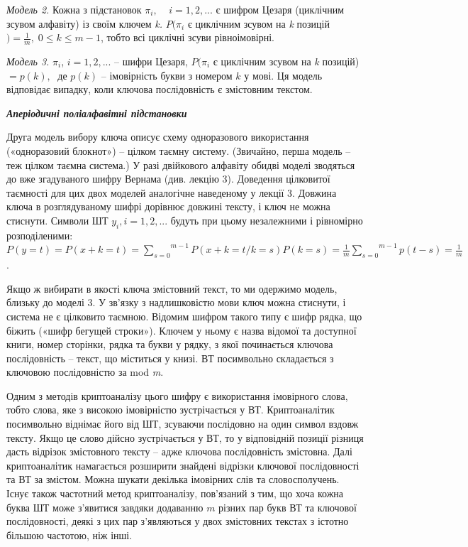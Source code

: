 \documentclass[a4paper]{article}
\newcounter{}
\begin{document}
 \textit{Модель 2.  } Кожна з підстановок  ${\pi
_{{i}},\;\;\;\;i=1,2,\text{.}\text{.}\text{.}}$ є шифром Цезаря (циклічним
зсувом алфавіту) із своїм ключем \textit{k}\textit{.}   ${P(\pi _{{i}}}$ є
циклічним зсувом на \textit{k} позицій ${)=\frac{1}{m},\;0\le k\le m-1}$, тобто
всі циклічні зсуви  рівноімовірні. $ $

 \textit{Модель 3.  } ${\pi _{{i}}}$,  ${i=1,2,\text{.}\text{.}\text{.}}$ –
шифри Цезаря,  ${P(\pi _{{i}}}$ є циклічним зсувом на \textit{k} позицій) 
${=p(k),\;}$ де  ${p(k)}$ – імовірність букви з номером  ${k}$ у мові. Ця
модель відповідає випадку, коли ключова послідовність є змістовним текстом. 


\bigskip

{\centering\bfseries\itshape
Аперіодичні поліалфавітні підстановки
\par}


\bigskip

Друга модель вибору ключа описує схему одноразового використання («одноразовий
блокнот») – цілком таємну систему. (Звичайно, перша модель – теж цілком таємна
система.) У разі двійкового алфавіту обидві моделі зводяться до вже згадуваного
шифру Вернама (див. лекцію 3). Доведення цілковитої таємності для цих двох
моделей аналогічне наведеному у лекції 3. Довжина ключа в розглядуваному шифрі
дорівнює довжині тексту, і ключ не можна стиснути. Символи ШТ 
${y_{{i}},i=1,2,\text{.}\text{.}\text{.}}$ будуть при цьому незалежними і
рівномірно розподіленими: 
${P(y=t)=P(x+k=t)=\overset{{m-1}}{\underset{{s=0}}{\sum
}}{P(x+k=t/k=s)P(k=s)}=\frac{1}{m}\overset{{m-1}}{\underset{{s=0}}{\sum
}}{p(t-s)=\frac{1}{m}}}$.

Якщо ж вибирати в якості ключа змістовний текст, то ми одержимо модель, близьку
до моделі 3. У зв’язку з надлишковістю мови ключ можна стиснути, і система не є
цілковито таємною. Відомим шифром такого типу є шифр рядка, що біжить («шифр
бегущей строки»). Ключем у ньому є назва відомої та доступної книги, номер
сторінки, рядка та букви у рядку, з якої починається ключова послідовність –
текст, що міститься у книзі. ВТ посимвольно складається з ключовою
послідовністю за mod \textit{m}.

Одним з методів криптоаналізу цього шифру є використання імовірного слова, тобто
слова, яке з високою імовірністю зустрічається у ВТ. Криптоаналітик посимвольно
віднімає його від ШТ, зсуваючи послідовно на один символ вздовж тексту. Якщо це
слово дійсно зустрічається у ВТ, то у відповідній позиції різниця дасть
відрізок змістовного тексту – адже ключова послідовність змістовна. Далі
криптоаналітик намагається розширити знайдені відрізки ключової послідовності
та ВТ за змістом. Можна шукати декілька імовірних слів та словосполучень. Існує
також частотний метод криптоаналізу, пов’язаний з тим, що хоча кожна буква ШТ
може з’явитися завдяки додаванню  ${m}$ різних пар букв ВТ та ключової
послідовності, деякі з цих пар з’являються у двох змістовних текстах з істотно
більшою частотою, ніж інші.
\end{document}
